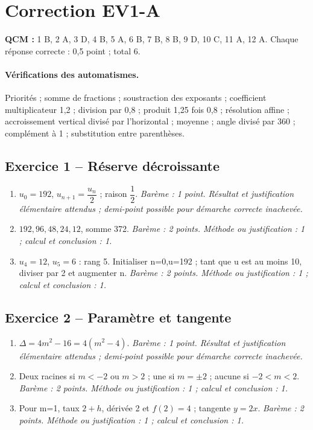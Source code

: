 \clearpage\section*{Correction EV1-A}\label{EV1-A-CORR}
\textbf{QCM :} 1 B, 2 A, 3 D, 4 B, 5 A, 6 B, 7 B, 8 B, 9 D, 10 C, 11 A, 12 A. Chaque réponse correcte : 0,5 point ; total 6.
\paragraph{Vérifications des automatismes.} Priorités ; somme de fractions ; soustraction des exposants ; coefficient multiplicateur 1,2 ; division par 0,8 ; produit 1,25 fois 0,8 ; résolution affine ; accroissement vertical divisé par l’horizontal ; moyenne ; angle divisé par 360 ; complément à 1 ; substitution entre parenthèses.
\subsection*{Exercice 1 -- Réserve décroissante}
\begin{enumerate}
\item $u_0=192$, $u_{n+1}=\dfrac{u_n}{2}$ ; raison $\dfrac{1}{2}$. \textit{Barème : 1 point. Résultat et justification élémentaire attendus ; demi-point possible pour démarche correcte inachevée.}
\item $192,96,48,24,12$, somme 372. \textit{Barème : 2 points. Méthode ou justification : 1 ; calcul et conclusion : 1.}
\item $u_4=12$, $u_5=6$ : rang 5. Initialiser n=0,u=192 ; tant que u est au moins 10, diviser par 2 et augmenter n. \textit{Barème : 2 points. Méthode ou justification : 1 ; calcul et conclusion : 1.}
\end{enumerate}
\subsection*{Exercice 2 -- Paramètre et tangente}
\begin{enumerate}
\item $\Delta=4m^2-16=4(m^2-4)$. \textit{Barème : 1 point. Résultat et justification élémentaire attendus ; demi-point possible pour démarche correcte inachevée.}
\item Deux racines si $m<-2$ ou $m>2$ ; une si $m=\pm2$ ; aucune si $-2<m<2$. \textit{Barème : 2 points. Méthode ou justification : 1 ; calcul et conclusion : 1.}
\item Pour m=1, taux $2+h$, dérivée 2 et $f(2)=4$ ; tangente $y=2x$. \textit{Barème : 2 points. Méthode ou justification : 1 ; calcul et conclusion : 1.}
\end{enumerate}
